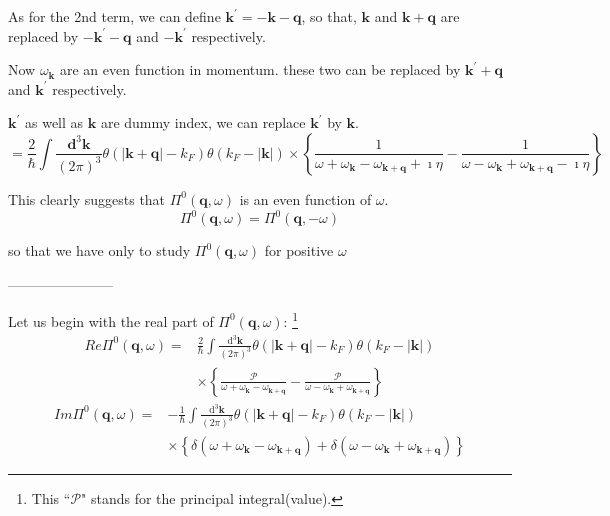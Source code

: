 As for the 2nd term, we can define $\mathbf{k}^{'} = -\mathbf{k}-\mathbf{q}$, so that, $\mathbf{k}$ and $\mathbf{k} + \mathbf{q}$ are replaced by $-\mathbf{k}^{'}-\mathbf{q}$ and $-\mathbf{k}^{'}$ respectively.

Now $\omega_\mathbf{k}$ are an even function in momentum. these two can be replaced by $\mathbf{k}^{'} + \mathbf{q}$ and $\mathbf{k}^{'}$ respectively.

$\mathbf{k}^{'}$ as well as $\mathbf{k}$ are dummy index, we can replace $\mathbf{k}^{'}$ by $\mathbf{k}$.
\[=\frac{2}{\hbar} \int \frac{\mathbf{d}^3 \mathbf{k}}{(2\pi)^3}\theta(|\mathbf{k}+\mathbf{q}|-k_F)\theta(k_F - |\mathbf{k}|) \times \left\{ \frac{1}{\omega+\omega_{\mathbf{k}}- \omega_{\mathbf{k}+\mathbf{q}}+\imath \eta} - \frac{1}{\omega-\omega_{\mathbf{k}}+ \omega_{\mathbf{k}+\mathbf{q}}-\imath \eta} \right\}\]

This clearly suggests that $\Pi^0(\mathbf{q},\omega)$ is an even function of $\omega$.
\begin{equation} \label{Eqs2.8.14} \Pi^0(\mathbf{q},\omega) = \Pi^0(\mathbf{q},-\omega)\end{equation}

so that we have only to study $\Pi^0(\mathbf{q},\omega)$ for positive $\omega$
\begin{center}-----------------------\end{center}

Let us begin with the real part of $\Pi^0(\mathbf{q},\omega)$:
\footnote{This ``$\mathscr{P}$" stands for the principal integral(value).}
\begin{equation} \label{Eqs2.8.15} \begin{split}
Re \Pi^0(\mathbf{q},\omega) =& \frac{2}{\hbar} \int \frac{\mathrm{d}^3 \mathbf{k}}{(2\pi)^3} \theta(|\mathbf{k}+\mathbf{q}|-k_F)\theta(k_F - |\mathbf{k}|)\\
& \times \left\{ \frac{\mathscr{P}}{\omega+\omega_{\mathbf{k}}- \omega_{\mathbf{k}+\mathbf{q}}} - \frac{\mathscr{P}}{\omega-\omega_{\mathbf{k}}+ \omega_{\mathbf{k}+\mathbf{q}}} \right\}
\end{split}\end{equation}
\begin{equation} \label{Eqs2.8.16} \begin{split}
Im \Pi^0(\mathbf{q},\omega) =& -\frac{1}{\hbar} \int \frac{\mathrm{d}^3 \mathbf{k}}{(2\pi)^3} \theta(|\mathbf{k}+\mathbf{q}|-k_F)\theta(k_F - |\mathbf{k}|) \\
&\times \left\{ \delta(\omega+\omega_{\mathbf{k}}- \omega_{\mathbf{k}+\mathbf{q}}) + \delta(\omega-\omega_{\mathbf{k}}+ \omega_{\mathbf{k}+\mathbf{q}}) \right\}
\end{split}\end{equation}

